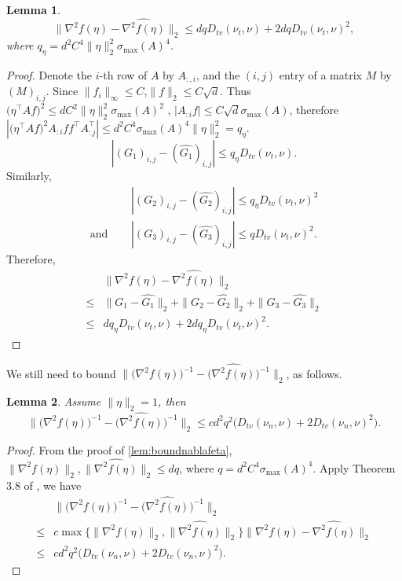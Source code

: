 \documentclass[english]{article} %
\newtheorem{lemma}{Lemma}[section]
\theoremstyle{definition}
\begin{document}
\begin{lemma}
\label{lem:nablavariation}
\[
\|\nabla^2 f(\eta) - \widehat{\nabla^2 f(\eta)}  \|_2 \le d q D_{tv}(\nu_t , \nu) + 2dq D_{tv}(\nu_t , \nu)^2,
\]
where $q_{\eta} = d^2C^4\|\eta\|_2^2\sigma_{\max}(A)^4$.
\end{lemma}
\begin{proof}
Denote the $i$-th row of $A$ by $A_{:,i}$, and the $(i,j)$ entry of a matrix $M$ by $(M)_{i,j}$. Since $\|f_i\|_\infty \le C$,$\|f\|_2 \le C\sqrt{d}$. 
Thus $\big(\eta^{\top}Af\big)^2 \le d C^2\|\eta\|_2^2\sigma_{\max}(A)^2$ 
,  $|A_{:i}f| \le C\sqrt{d}\sigma_{\max}(A)$, 
therefore $|\big(\eta^{\top}Af\big)^2 A_{:i}ff^{\top} A_{:j}^{\top}| \le d^2C^4\sigma_{\max}(A)^4 \|\eta\|_2^2 = q_{\eta}$.
\[
|(G_1)_{i,j} - (\widehat{G_1})_{i,j} | \le q_{\eta} D_{tv}(\nu_t , \nu).
\]
Similarly, 
\begin{align*}
& |(G_2)_{i,j} - (\widehat{G_2})_{i,j} | \le q_{\eta} D_{tv}(\nu_t , \nu)^2 \\
\text{and } \quad & |(G_3)_{i,j} - (\widehat{G_3})_{i,j} | \le q D_{tv}(\nu_t , \nu)^2.
\end{align*}
Therefore,
\begin{align*}
	& \|\nabla^2 f(\eta) - \widehat{\nabla^2 f(\eta)}  \|_2 \\
\le & \|G_1 - \widehat{G_1}\|_2 + \|G_2 - \widehat{G_2}\|_2 + \|G_3 - \widehat{G_3}\|_2 \\
\le & d q_{\eta} D_{tv}(\nu_t , \nu) + 2dq_{\eta} D_{tv}(\nu_t , \nu)^2.
\end{align*}
\end{proof}

We still need to bound $\|\big(\nabla^2 f(\eta)\big)^{-1} - \big(\widehat{\nabla^2 f(\eta)}\big)^{-1}  \|_2 $, as follows.
\begin{lemma}
Assume $\|\eta\|_2 = 1$, then 
\[
\|\big(\nabla^2 f(\eta)\big)^{-1} - \big(\widehat{\nabla^2 f(\eta)}\big)^{-1}  \|_2 \le cd^2q^2\big(D_{tv}(\nu_n , \nu) + 2D_{tv}(\nu_n , \nu)^2\big).
\]
\end{lemma}
\begin{proof}
From the proof of \cref{lem:boundnablafeta}, $\|\nabla^2 f(\eta)\|_2, \|\widehat{\nabla^2 f(\eta)}\|_2 \le dq$, where $q = d^2C^4\sigma_{\max}(A)^4$.
Apply Theorem 3.8 of \citep*{stewart1990matrix}, we have 
\begin{align*}
& \|\big(\nabla^2 f(\eta)\big)^{-1} - \big(\widehat{\nabla^2 f(\eta)}\big)^{-1}  \|_2 \\
\le & c\max\{\|\nabla^2 f(\eta)\|_2, \|\widehat{\nabla^2 f(\eta)}\|_2\} \|\nabla^2 f(\eta) - \widehat{\nabla^2 f(\eta)}\|_2 \\
\le & cd^2q^2\big(D_{tv}(\nu_n , \nu) + 2D_{tv}(\nu_n , \nu)^2\big).
\end{align*}

\end{proof}
\fi
\end{document}
